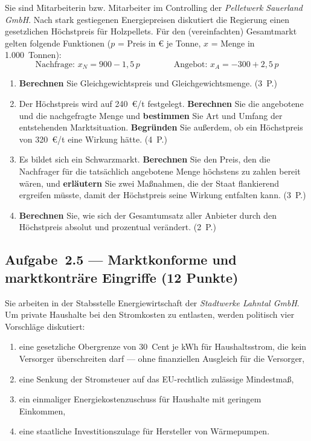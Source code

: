 Sie sind Mitarbeiterin bzw. Mitarbeiter im Controlling der \emph{Pelletwerk Sauerland GmbH}.
Nach stark gestiegenen Energiepreisen diskutiert die Regierung einen gesetzlichen
Höchstpreis für Holzpellets. Für den (vereinfachten) Gesamtmarkt gelten folgende
Funktionen ($p$ = Preis in € je Tonne, $x$ = Menge in 1.000~Tonnen):
\[
\text{Nachfrage: } x_N = 900 - 1{,}5\,p \qquad\qquad \text{Angebot: } x_A = -300 + 2{,}5\,p
\]

\begin{enumerate}[label=\alph*)]
  \item \textbf{Berechnen} Sie Gleichgewichtspreis und Gleichgewichtsmenge. \hfill (3~P.)
  \item Der Höchstpreis wird auf 240~€/t festgelegt. \textbf{Berechnen} Sie die angebotene
    und die nachgefragte Menge und \textbf{bestimmen} Sie Art und Umfang der entstehenden
    Marktsituation. \textbf{Begründen} Sie außerdem, ob ein Höchstpreis von 320~€/t eine
    Wirkung hätte. \hfill (4~P.)
  \item Es bildet sich ein Schwarzmarkt. \textbf{Berechnen} Sie den Preis, den die
    Nachfrager für die tatsächlich angebotene Menge höchstens zu zahlen bereit wären, und
    \textbf{erläutern} Sie zwei Maßnahmen, die der Staat flankierend ergreifen müsste,
    damit der Höchstpreis seine Wirkung entfalten kann. \hfill (3~P.)
  \item \textbf{Berechnen} Sie, wie sich der Gesamtumsatz aller Anbieter durch den
    Höchstpreis absolut und prozentual verändert. \hfill (2~P.)
\end{enumerate}

\subsection*{Aufgabe~2.5 --- Marktkonforme und marktkonträre Eingriffe (12 Punkte)}

Sie arbeiten in der Stabsstelle Energiewirtschaft der \emph{Stadtwerke Lahntal GmbH}. Um
private Haushalte bei den Stromkosten zu entlasten, werden politisch vier Vorschläge
diskutiert:

\begin{enumerate}[label=(\arabic*)]
  \item eine gesetzliche Obergrenze von 30~Cent je kWh für Haushaltsstrom, die kein
    Versorger überschreiten darf --- ohne finanziellen Ausgleich für die Versorger,
  \item eine Senkung der Stromsteuer auf das EU-rechtlich zulässige Mindestmaß,
  \item ein einmaliger Energiekostenzuschuss für Haushalte mit geringem Einkommen,
  \item eine staatliche Investitionszulage für Hersteller von Wärmepumpen.
\end{enumerate}

